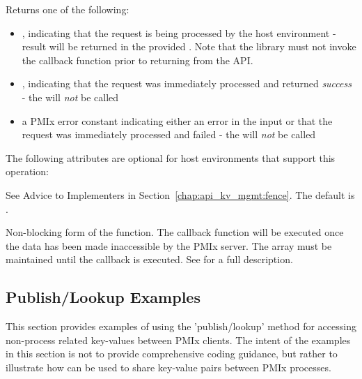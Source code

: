 Returns one of the following:

\begin{itemize}
    \item {}, indicating that the request is being processed by the host environment - result will be returned in the provided . Note that the library must not invoke the callback function prior to returning from the \ac{API}.
    \item {}, indicating that the request was immediately processed and returned \textit{success} - the  will \textit{not} be called
    \item a PMIx error constant indicating either an error in the input or that the request was immediately processed and failed - the  will \textit{not} be called
\end{itemize}

\optattrstart
The following attributes are optional for host environments that support this operation:

See Advice to Implementers in Section~\ref{chap:api_kv_mgmt:fence}.
\pastePRIAttributeItemEnd
{}
The default is .
\pastePRIAttributeItemEnd

\optattrend


\descr

Non-blocking form of the  function.
The callback function will be executed once the data has been made inaccessible by the \ac{PMIx} server.
The  array must be maintained until the callback is executed.
See  for a full description.


\subsection{Publish/Lookup Examples}
\label{chap:api_kv_mgmt:publookex}


This section provides examples of using the 'publish/lookup' method for accessing non-process related key-values between \ac{PMIx} clients.
The intent of the examples in this section is not to provide comprehensive coding guidance, but rather to illustrate how  can be used to share key-value pairs between \ac{PMIx} processes.


